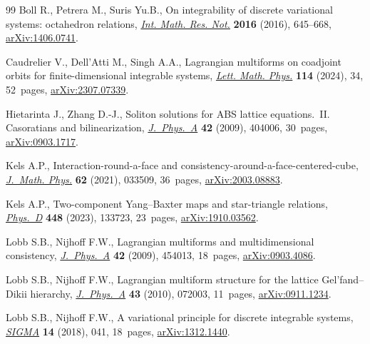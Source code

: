 \documentclass[pdftex]{sigma}
\numberwithin{equation}{section}
\begin{document}
\begin{thebibliography}{99}
Boll R., Petrera M., Suris Yu.B., On integrability of discrete variational
 systems: octahedron relations,
 \href{https://doi.org/10.1093/imrn/rnv140}{\textit{Int. Math. Res. Not.}} \textbf{2016} (2016), 645--668,
 \href{http://arxiv.org/abs/1406.0741}{arXiv:1406.0741}.

Caudrelier V., Dell'Atti M., Singh A.A., Lagrangian multiforms on coadjoint
 orbits for finite-dimensional integrable systems,
 \href{https://doi.org/10.1007/s11005-023-01766-9}{\textit{Lett. Math. Phys.}}
 \textbf{114} (2024), 34, 52~pages,
 \href{http://arxiv.org/abs/2307.07339}{arXiv:2307.07339}.

Hietarinta J., Zhang D.-J., Soliton solutions for {ABS} lattice equations.~{II}.
 {C}asoratians and bilinearization,
 \href{https://doi.org/10.1088/1751-8113/42/40/404006}{\textit{J.~Phys.~A}}
 \textbf{42} (2009), 404006, 30~pages,
 \href{http://arxiv.org/abs/0903.1717}{arXiv:0903.1717}.

Kels A.P., Interaction-round-a-face and
 consistency-around-a-face-centered-cube,
 \href{https://doi.org/10.1063/5.0024630}{\textit{J.~Math. Phys.}} \textbf{62}
 (2021), 033509, 36~pages,
 \href{http://arxiv.org/abs/2003.08883}{arXiv:2003.08883}.

Kels A.P., Two-component {Y}ang--{B}axter maps and star-triangle relations,
 \href{https://doi.org/10.1016/j.physd.2023.133723}{\textit{Phys.~D}}
 \textbf{448} (2023), 133723, 23~pages,
 \href{http://arxiv.org/abs/1910.03562}{arXiv:1910.03562}.

Lobb S.B., Nijhoff F.W., Lagrangian multiforms and multidimensional
 consistency,
 \href{https://doi.org/10.1088/1751-8113/42/45/454013}{\textit{J.~Phys.~A}}
 \textbf{42} (2009), 454013, 18~pages,
 \href{http://arxiv.org/abs/0903.4086}{arXiv:0903.4086}.

Lobb S.B., Nijhoff F.W., Lagrangian multiform structure for the lattice
 {G}el'fand--{D}ikii hierarchy,
 \href{https://doi.org/10.1088/1751-8113/43/7/072003}{\textit{J.~Phys.~A}}
 \textbf{43} (2010), 072003, 11~pages,
 \href{http://arxiv.org/abs/0911.1234}{arXiv:0911.1234}.

Lobb S.B., Nijhoff F.W., A variational principle for discrete integrable
 systems, \href{https://doi.org/10.3842/SIGMA.2018.041}{\textit{SIGMA}}
 \textbf{14} (2018), 041, 18~pages,
 \href{http://arxiv.org/abs/1312.1440}{arXiv:1312.1440}.


\end{thebibliography}
\end{document}
